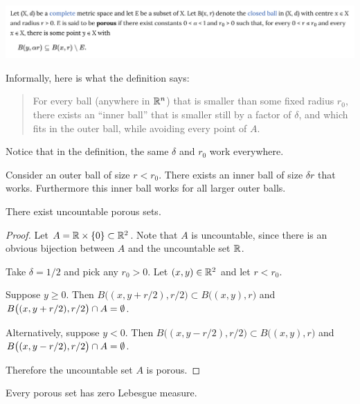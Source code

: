 \begin{mdframed}
\includegraphics[width=400pt]{img/analysis--berkeley-202a-final-b463.png}
\end{mdframed}

Informally, here is what the definition says:

\begin{quote}
  For every ball (anywhere in $\mathbb{R}^n$) that is smaller than some fixed radius $r_0$, there exists an ``inner
  ball​'' that is smaller still by a factor of $\delta$, and which fits in the outer ball, while avoiding every
  point of $A$.
\end{quote}

Notice that in the definition, the same $\delta$ and $r_0$ work everywhere.

Consider an outer ball of size $r < r_0$. There exists an inner ball of size $\delta r$ that works. Furthermore
this inner ball works for all larger outer balls.

\begin{claim}
  There exist uncountable porous sets.
\end{claim}

\begin{proof}

  Let $A = \mathbb{R} \times \{0\} \subset \mathbb{R}^2$. Note that $A$ is uncountable, since there is an obvious bijection
  between $A$ and the uncountable set $\mathbb{R}$.

  Take $\delta = 1/2$ and pick any $r_0 > 0$. Let $(x, y) \in \mathbb{R}^2$ and let $r < r_0$.

  Suppose $y \geq 0$. Then $B\big((x, y + r/2), r/2\big) \subset B\big((x, y), r\big)$
  and $B\big((x, y + r/2), r/2\big) \cap A = \emptyset$.

  Alternatively, suppose $y < 0$. Then $B\big((x, y - r/2), r/2\big) \subset B\big((x, y), r\big)$
  and $B\big((x, y - r/2), r/2\big) \cap A = \emptyset$.

  Therefore the uncountable set $A$ is porous.
\end{proof}

\begin{claim}
  Every porous set has zero Lebesgue measure.
\end{claim}

